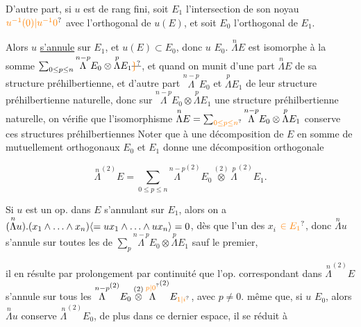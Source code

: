 D'autre part, si $u$ est de rang fini,   soit $E_{1}$ l'intersection de son noyau $\unsure{u^{-1}(0)|u^{-1}0}$ avec l'orthogonal de  $u(E)$, et soit $E_0$ l'orthogonal de $E_1$.

Alors $u$ \uline{s'annule} sur $E_1$, et $u(E)\subset E_0$, donc $u$ \uline{} $E_0$. $\overset{n}{\Lambda}E$ est   isomorphe à la somme $\sum_{0\leq p\leq n}\overset{n-p}{\Lambda}E_0\otimes\overset{p}{\Lambda}E_1\deleted{\unsure{\}}}$, et quand on munit d'une  part $\overset{n}{\Lambda}E$ de sa structure préhilbertienne, et d'autre part $\overset{n-p}{\Lambda}E_0$ et $\overset{p}{\Lambda}E_1$ de leur structure préhilbertienne naturelle, donc sur $\overset{n-p}{\Lambda}E_0\otimes\overset{p}{\Lambda}E_1$ une structure préhilbertienne naturelle, on vérifie que l'isomorphisme $\overset{n}{\Lambda}E=\sum_{\unsure{0\leq p\leq n}}\overset{n-p}{\Lambda}E_0\otimes\overset{p}{\Lambda}E_1$
conserve ces structures préhilbertiennes  Noter que à une décomposition de $E$  en somme de  mutuellement orthogonaux $E_0$ et $E_1$ donne une décomposition orthogonale

\[
\overset{n}{\Lambda}^{(2)}E=\sum_{0\leq p\leq n}\overset{n-p}{\Lambda}^{(2)}E_0\overset{(2)}{\otimes}\overset{p}{\Lambda}^{(2)}E_1 .
\]

Si $u$ est un op. dans $E$ s'annulant sur $E_1$, alors on a $(\overset{n}{\Lambda}u).(x_1\wedge\ldots\wedge x_n)\inserted{=ux_1\wedge\ldots\wedge ux_n}=0$,  dès que l'un  des $x_i$  $\unsure{\in E_1}$, donc $\overset{n}{\Lambda}u$ s'annule sur  toutes les   de $\sum_p\overset{n-p}{\Lambda}E_0\otimes\overset{p}{\Lambda}E_1$ sauf le premier, 

il en résulte par prolongement par continuité que l'op. correspondant dans $\overset{n}{\Lambda}^{(2)}E$ s'annule sur tous les $\overset{n-p}{\Lambda}^{(2)}E_0\overset{(2)}{\otimes}\overset{\unsure{p|0}}{\Lambda}^{(2)}E_{\unsure{1|i}}$,  avec $p\neq0$.   même que, si $u$  $E_0$, alors $\overset{n}{\Lambda}u$ conserve $\overset{n}{\Lambda}^{(2)}E_0$, de plus dans   ce dernier espace, il se réduit à

